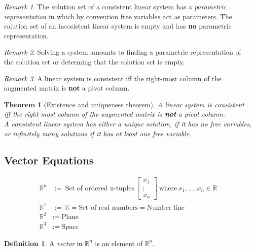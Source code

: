 \documentclass{article}
\newtheorem{theorem}{Theorem}[section]
\theoremstyle{definition}
\newtheorem{definition}{Definition}[section]
\theoremstyle{remark}
\newtheorem*{remark}{Remark}
\theoremstyle{remark}
\theoremstyle{remark}
\newtheorem*{it follows}{It follows}
\begin{document}
\begin{remark}
  The solution set of a consistent linear system has a \textit{parametric representation} in which by convention free variables act as parameters. The solution set of an incosistent linear system is empty and has \textbf{no} parametric representation.
\end{remark}

\begin{remark}
  Solving a system amounts to finding a parametric representation of the solution set or determing that the solution set is empty.
\end{remark}

\begin{remark}
  A linear system is consistent iff the right-most column of the augmented matrix is \textbf{not} a pivot column.
\end{remark}

\begin{theorem}[Existence and uniqueness theorem]
  A linear system is consistent iff the right-most column of the augmented matrix is \textbf{not} a pivot column. \\
  A consistent linear system has either a unique solution, if it has no free variables, or infinitely many solutions if it has at least one free variable.
\end{theorem}

\subsection{Vector Equations}

\begin{align*}
  \mathbb{R}^n &:=\ \text{Set of ordered n-tuples}\
  \begin{bmatrix}
    x_1 \\
    \vdots  \\
    x_n
  \end{bmatrix}\
  \text{where}\ x_1, \dots, x_n \in \mathbb{R} \\
  \mathbb{R}^1 &:=\ \mathbb{R} = \text{Set of real numbers} =\text{Number line} \\
  \mathbb{R}^2 &:=\ \text{Plane} \\
  \mathbb{R}^3 &:=\ \text{Space}
\end{align*}

\begin{definition}
  A \textit{vector} in $\mathbb{R}^n$ is an element of $\mathbb{R}^n$.
\end{definition}
\end{document}
